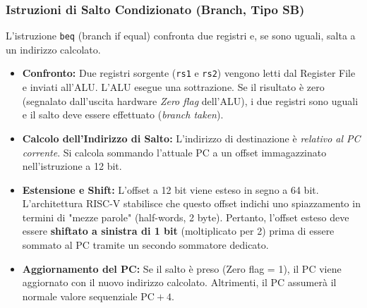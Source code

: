\documentclass[12pt, a4paper]{article}
\begin{document}
\subsubsection{Istruzioni di Salto Condizionato (Branch, Tipo SB)}
L'istruzione \texttt{beq} (branch if equal) confronta due registri e, se sono uguali, salta a un indirizzo calcolato.
\begin{itemize}
    \item \textbf{Confronto:} Due registri sorgente (\texttt{rs1} e \texttt{rs2}) vengono letti dal Register File e inviati all'ALU. L'ALU esegue una sottrazione. Se il risultato è zero (segnalato dall'uscita hardware \textit{Zero flag} dell'ALU), i due registri sono uguali e il salto deve essere effettuato (\textit{branch taken}).
    \item \textbf{Calcolo dell'Indirizzo di Salto:} L'indirizzo di destinazione è \textit{relativo al PC corrente}. Si calcola sommando l'attuale PC a un offset immagazzinato nell'istruzione a 12 bit.
    \item \textbf{Estensione e Shift:} L'offset a 12 bit viene esteso in segno a 64 bit. L'architettura RISC-V stabilisce che questo offset indichi uno spiazzamento in termini di "mezze parole" (half-words, 2 byte). Pertanto, l'offset esteso deve essere \textbf{shiftato a sinistra di 1 bit} (moltiplicato per 2) prima di essere sommato al PC tramite un secondo sommatore dedicato.
    \item \textbf{Aggiornamento del PC:} Se il salto è preso (Zero flag = 1), il PC viene aggiornato con il nuovo indirizzo calcolato. Altrimenti, il PC assumerà il normale valore sequenziale $\text{PC} + 4$.
\end{itemize}
\end{document}
